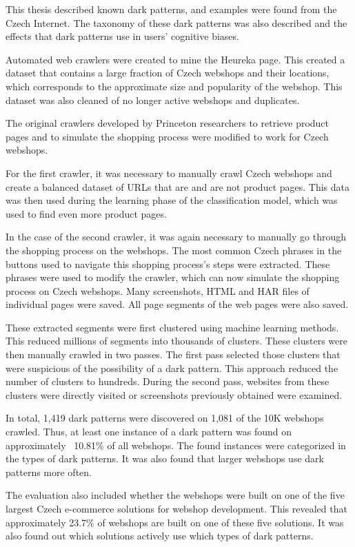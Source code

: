\label{Conclusion}

This thesis described known dark patterns, and examples were found from the Czech Internet. The taxonomy of these dark patterns was also described and the effects that dark patterns use in users' cognitive biases.

Automated web crawlers were created to mine the Heureka page. This created a dataset that contains a large fraction of Czech webshops and their locations, which corresponds to the approximate size and popularity of the webshop. This dataset was also cleaned of no longer active webshops and duplicates.

The original crawlers developed by Princeton researchers to retrieve product pages and to simulate the shopping process were modified to work for Czech webshops.

For the first crawler, it was necessary to manually crawl Czech webshops and create a balanced dataset of URLs that are and are not product pages. This data was then used during the learning phase of the classification model, which was used to find even more product pages.

In the case of the second crawler, it was again necessary to manually go through the shopping process on the webshops. The most common Czech phrases in the buttons used to navigate this shopping process's steps were extracted. These phrases were used to modify the crawler, which can now simulate the shopping process on Czech webshops. Many screenshots, HTML and HAR files of individual pages were saved. All page segments of the web pages were also saved.

These extracted segments were first clustered using machine learning methods. This reduced millions of segments into thousands of clusters. These clusters were then manually crawled in two passes. The first pass selected those clusters that were suspicious of the possibility of a dark pattern. This approach reduced the number of clusters to hundreds. During the second pass, websites from these clusters were directly visited or screenshots previously obtained were examined. 

In total, 1,419 dark patterns were discovered on 1,081 of the 10K webshops crawled. Thus, at least one instance of a dark pattern was found on approximately ~10.81\% of all webshops. The found instances were categorized in the types of dark patterns. It was also found that larger webshops use dark patterns more often.

The evaluation also included whether the webshops were built on one of the five largest Czech e-commerce solutions for webshop development. This revealed that approximately 23.7\% of webshops are built on one of these five solutions. It was also found out which solutions actively use which types of dark patterns.

